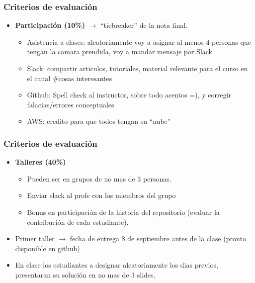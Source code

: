 \documentclass[
  shownotes,
  xcolor={svgnames},
  hyperref={colorlinks,citecolor=DarkBlue,linkcolor=DarkRed,urlcolor=DarkBlue}
  ]{beamer}
\begin{document}
\begin{frame}
\frametitle{Criterios de evaluación}

\begin{itemize}
\item {\bf Participación (10\%)} $\rightarrow$ ``tiebreaker'' de la nota final. 
\bigskip
  \begin{itemize}
    \item Asistencia a clases: aleatoriamente voy a asignar al menos 4 personas que tengan la camara prendida, voy a mandar mensaje por Slack
    \bigskip
    \item Slack: compartir articulos, tutoriales, material relevante para el curso en el canal \#cosas interesantes
    \bigskip
    \item Github: Spell check al instructor, sobre todo acentos =), y corregir falacias/errores conceptuales
    \bigskip
    \item AWS: credito para que todos tengan su ``nube''

  \end{itemize}
\end{itemize}

\end{frame}
\begin{frame}
\frametitle{Criterios de evaluación}
\begin{itemize}
  \item {\bf Talleres (40\%)}
  \bigskip
\begin{itemize}
  \item Pueden ser en grupos de no mas de 3 personas. 
  \medskip
  \item Enviar slack al profe con los miembros del grupo
  \medskip
  \item Bonus en participación de la historia del repositorio (evaluar la contribución de cada estudiante).
  \end{itemize}
\bigskip

   \item Primer taller $\rightarrow$ fecha de entrega 8 de septiembre antes de la clase (pronto disponible en github)
   \bigskip
   \item En clase los estudiantes a designar aleatoriamente los dias previos, presentaran su solución en no mas de 3 slides.
\end{itemize}

\end{frame}
\end{document}
